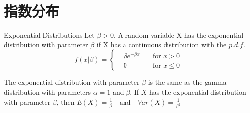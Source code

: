 \documentclass[../常见分布.tex]{subfiles}
\begin{document}
\section{指数分布}
\begin{definition}{Exponential Distributions}{}
Let $\beta>0$. A random variable X has the exponential distribution with parameter $\beta$ if X has a continuous distribution with the $p.d.f.$
\begin{equation}\label{}
f(x|\beta)=\left\lbrace \begin{aligned}
&\beta e^{-\beta x} &\quad\text{for $x > 0$}\\
&0 &\quad\text{for $x \leqslant 0$}
\end{aligned}
\right.
\end{equation}
\end{definition}

\begin{theorem}{}{}
The exponential distribution with parameter $\beta$ is the same as the gamma distribution
with parameters $\alpha = 1$ and $\beta$. If $X$ has the exponential distribution with parameter
$\beta$, then
$E(X)=\frac{1}{\beta} \quad\text{and}\quad Var(X)=\frac{1}{\beta^2}$

\end{theorem}
\end{document}
